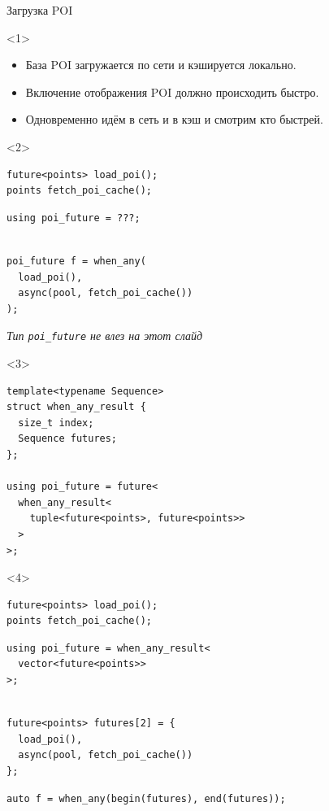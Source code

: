 \documentclass[aspectratio=169,hyperref={unicode},17pt]{beamer}
\begin{document}
\begin{frame}[fragile,t]{Загрузка POI}
\begin{onlyenv}<1>
\begin{itemize}
 \item База POI загружается по сети и кэшируется локально.
 \item Включение отображения POI должно происходить быстро.
 \item Одновременно идём в сеть и в кэш и смотрим кто быстрей.
\end{itemize}
\end{onlyenv}
\begin{onlyenv}<2>
\begin{lstlisting}[style=cppcode,aboveskip=0pt,belowskip=0pt]
future<points> load_poi();
points fetch_poi_cache();
\end{lstlisting}
\begin{lstlisting}[style=cppcode,backgroundcolor=\color{gray!30},aboveskip=0pt,belowskip=0pt]
using poi_future = ???;
\end{lstlisting}
\begin{lstlisting}[style=cppcode,aboveskip=0pt,belowskip=0pt]

poi_future f = when_any(
  load_poi(),
  async(pool, fetch_poi_cache())
);
\end{lstlisting}
\textit{\footnotesize{Тип \texttt{poi\_future} не влез на этот слайд}}
\end{onlyenv}
\begin{onlyenv}<3>
\begin{lstlisting}[style=cppcode]
template<typename Sequence>
struct when_any_result {
  size_t index;
  Sequence futures;
};

using poi_future = future<
  when_any_result<
    tuple<future<points>, future<points>>
  >
>;
\end{lstlisting}
\end{onlyenv}
\begin{onlyenv}<4>
\begin{lstlisting}[style=cppcode,belowskip=0pt]
future<points> load_poi();
points fetch_poi_cache();
\end{lstlisting}
\begin{lstlisting}[style=cppcode,backgroundcolor=\color{gray!30},aboveskip=0pt,belowskip=0pt]
using poi_future = when_any_result<
  vector<future<points>>
>;
\end{lstlisting}
\begin{lstlisting}[style=cppcode,aboveskip=0pt,belowskip=0pt]

future<points> futures[2] = {
  load_poi(),
  async(pool, fetch_poi_cache())
};
\end{lstlisting}
\begin{lstlisting}[style=cppcode,backgroundcolor=\color{gray!30},aboveskip=0pt]
auto f = when_any(begin(futures), end(futures));
\end{lstlisting}
\end{onlyenv}
\end{frame}
\end{document}
